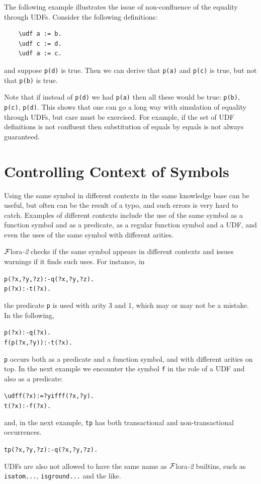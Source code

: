 \documentclass[11pt]{article}
\newcommand{\FLORA}{{\mbox{\sc ${\cal F}${lora}\rm\emph{-2}}}\xspace}
\newcommand{\FLSYSTEM}{\FLORA}
\newcommand{\bs}{\textbackslash}
\begin{document}
The following example illustrates the issue of non-confluence of the
equality through UDFs. Consider the following definitions:
\begin{verbatim}
    \udf a := b.
    \udf c := d.
    \udf a := c.
\end{verbatim}
and suppose \texttt{p(d)} is true. Then we can derive that \texttt{p(a)}
and \texttt{p(c)} is true, but not that \texttt{p(b)} is true.    

Note that if instead of \texttt{p(d)} we had \texttt{p(a)} then all these
would be true: \texttt{p(b)}, \texttt{p(c)}, \texttt{p(d)}.
This shows that one can go a long way
with simulation of equality through UDFs, but care must be exercised.
For example, if the set of UDF definitions is not confluent then
substitution of equals by equals is not always guaranteed.


\section{Controlling Context of Symbols} \label{sec:symbol}


Using the same symbol in different contexts in the same knowledge base can be
useful, but often can be the result of a typo, and such errors is very hard
to catch. Examples of different contexts include the use of the same symbol
as a function symbol and as a predicate, as a regular function symbol and a
UDF, and even the uses of the same symbol with different arities.

\FLSYSTEM checks if the same symbol appears in different contexts
and issues warnings if it finds such uses. For instance, in
\begin{alltt}
	p(?x,?y,?z):-q(?x,?y,?z).
	p(?x):-t(?x).
\end{alltt}
the predicate \texttt{p} is used with arity 3 and 1, which may or may not be a
mistake. In the following,
\begin{alltt}
	p(?x):-q(?x).
	f(p(?x,?y)):-t(?x).
\end{alltt}
\texttt{p} occurs both as a predicate and a function symbol, and with
different arities on top. In the next example we encounter the symbol
\texttt{f} in the role of a UDF and also as a predicate:  
\begin{alltt}
	\bs{}udf f(?x):=?y if ff(?x,?y).
	t(?x):-f(?x).
\end{alltt}
and, in the next example, \texttt{tp} has both transactional and
non-transactional occurrences. 
\begin{alltt}
	tp(?x,?y,?z):-q(?x,?y,?z).
\end{alltt}
UDFs are also not allowed to have the same name as \FLSYSTEM builtins, such
as \texttt{isatom{...}}, \texttt{isground{...}} and the like.  
\end{document}
